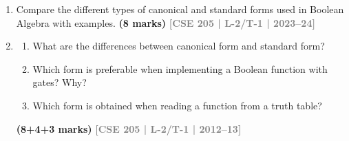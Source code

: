 \documentclass[12pt]{article}
\newcommand{\yr}[1]{\hfill\textcolor{gray}{\small\textbf{[#1]}}}
\newcommand{\mk}[1]{\textcolor{orange!70!black}{\small\textbf{(#1 marks)}}}
\begin{document}
\begin{enumerate}

\item Compare the different types of canonical and standard forms used in Boolean Algebra with examples.
\mk{8} \yr{CSE 205 | L-2/T-1 | 2023--24}

\item
\begin{enumerate}
  \item What are the differences between canonical form and standard form?
  \item Which form is preferable when implementing a Boolean function with gates? Why?
  \item Which form is obtained when reading a function from a truth table?
\end{enumerate}
\mk{8+4+3} \yr{CSE 205 | L-2/T-1 | 2012--13}

\end{enumerate}
\end{document}
